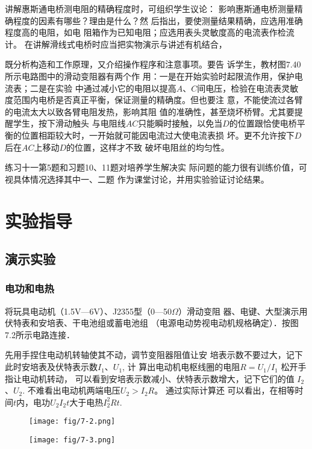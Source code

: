 讲解惠斯通电桥测电阻的精确程度时，可组织学生议论：
影响惠斯通电桥测量精确程度的因素有哪些？理由是什么？然
后指出，要使测量结果精确，应选用准确程度高的电阻，如电
阻箱作为已知电阻；应选用表头灵敏度高的电流表作检流计。
在讲解滑线式电桥时应当把实物演示与讲述有机结合，

既分析构造和工作原理，又介绍操作程序和注意事项。要告
诉学生，教材图7.40所示电路图中的滑动变阻器有两个作
用：一是在开始实验时起限流作用，保护电流表；二是在实验
中通过减小它的电阻以提高$A$、$C$间电压，检验在电流表灵敏
度范围内电桥是否真正平衡，保证测量的精确度。但也要注
意，不能使流过各臂的电流太大以致各臂电阻发热，影响其阻
值的准确性，甚至烧坏桥臂。尤其要提醒学生，按下滑动触头
与电阻线$AC$只能瞬时接触，以免当$D$的位置跟恰使电桥平
衡的位置相距较大时，一开始就可能因电流过大使电流表损
坏。更不允许按下$D$后在$AC$上移动$D$的位置，这样才不致
破坏电阻丝的均匀性。

练习十一第5题和习题10、11题对培养学生解决实
际问题的能力很有训练价值，可视具体情况选择其中一、二题
作为课堂讨论，并用实验验证讨论结果。


\section{实验指导}
\subsection{演示实验}
\subsubsection{电功和电热}
将玩具电动机（1.5V—6V）、J2355型（0—50$\Omega$）滑动变阻
器、电键、大型演示用伏特表和安培表、干电池组或蓄电池组
（电源电动势视电动机规格确定）．按图7.2所示电路连接．

先用手捏住电动机转轴使其不动，调节变阻器阻值让安
培表示数不要过大，记下此时安培表及伏特表示数$I_1$、$U_1$, 计
算出电动机电枢线圈的电阻$R=U_1/I_1$
松开手指让电动机转动，
可以看到安培表示数减小、伏特表示数增大，记下它们的值
$I_2$、$U_2$. 不难看出电动机两端电压$U_2>I_2R$。 通过实际计算还
可以看出，在相等时间$t$内，电功$U_2I_2t$大于电热$I_2^2Rt$.
\begin{figure}[htp]\centering
    \begin{minipage}[t]{0.48\textwidth}
    \centering
 \texttt{[image: fig/7-2.png]}
    \caption{}
    \end{minipage}
    \begin{minipage}[t]{0.48\textwidth}
    \centering
 \texttt{[image: fig/7-3.png]}
    \caption{}
    \end{minipage}
    \end{figure}

